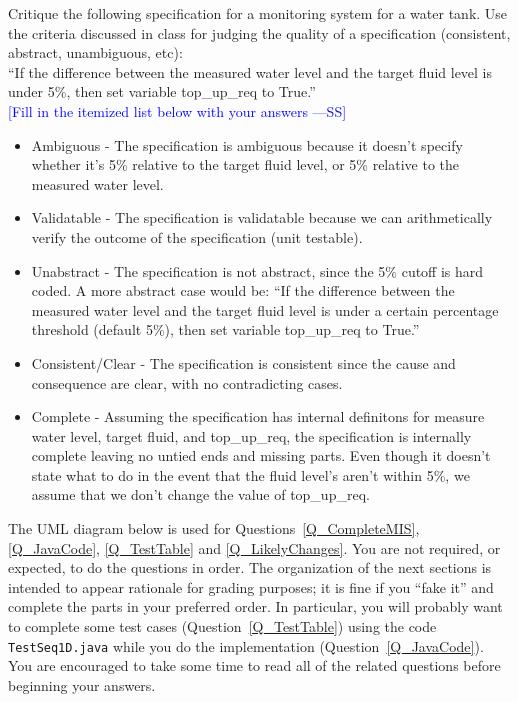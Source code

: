 \documentclass[12pt,fleqn]{examtst}
\newcommand{\authornote}[3]{\textcolor{#1}{[#3 ---#2]}}
\newcommand{\authornote}[3]{}
\newcommand{\wss}[1]{\authornote{blue}{SS}{#1}}
\begin{document}
\noindent
\begin{minipage}{\textwidth}

Critique the following specification for a monitoring system for a water tank.
Use the criteria discussed in class for judging the quality of a specification
(consistent, abstract, unambiguous, etc):\\

``If the difference between the measured water level and the target fluid level is
under 5\%, then set variable top\_up\_req to True.''
~\\

\noindent \wss{Fill in the itemized list below with your answers}

\begin{itemize}
\item Ambiguous - The specification is ambiguous because it doesn't specify
whether it's 5\% relative to the target fluid level, or 5\% relative to the
measured water level.
\item Validatable - The specification is validatable because we can
arithmetically verify the outcome of the specification (unit testable).
\item Unabstract - The specification is not abstract, since the 5\% cutoff
is hard coded. A more abstract case would be: ``If the difference between the
measured water level and the target fluid level is under a certain
percentage threshold (default 5\%), then set variable top\_up\_req to True.''
\item Consistent/Clear - The specification is consistent since the cause and
consequence are clear, with no contradicting cases.
\item Complete - Assuming the specification has internal definitons for
measure water level, target fluid, and top\_up\_req, the specification is
internally complete leaving no untied ends and missing parts. Even though it
doesn't state what to do in the event that the fluid level's aren't within
5\%, we assume that we don't change the value of top\_up\_req.
\end{itemize}

\end{minipage}


\newpage

\noindent The UML diagram below is used for Questions~\ref{Q_CompleteMIS},
\ref{Q_JavaCode}, \ref{Q_TestTable} and \ref{Q_LikelyChanges}.  You are not
required, or expected, to do the questions in order.  The organization of the
next sections is intended to appear rationale for grading purposes; it is fine
if you ``fake it'' and complete the parts in your preferred order.  In
particular, you will probably want to complete some test cases
(Question~\ref{Q_TestTable}) using the code \texttt{TestSeq1D.java} while you do
the implementation (Question~\ref{Q_JavaCode}).  You are encouraged to take some
time to read all of the related questions before beginning your answers.
\end{document}
